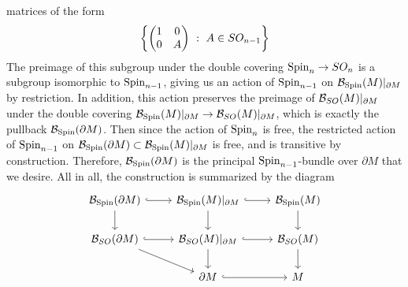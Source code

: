 matrices of the form
\[
\left\lbrace \begin{pmatrix}
1 & 0 \\
0 & A
\end{pmatrix} ~ : ~ A \in SO_{n-1} \right\rbrace
\]
The preimage of this subgroup under the double covering $\mathrm{Spin}_n \to SO_n$ is
a subgroup isomorphic to $\mathrm{Spin}_{n-1}$, giving us an action of $\mathrm{Spin}_{n-1}$ on
$\mathcal{B}_{\mathrm{Spin}}(M)\vert_{\partial M}$ by restriction. In addition, this action
preserves the preimage of $\mathcal{B}_{SO}(M)\vert_{\partial M}$ under the double
covering $\mathcal{B}_{\mathrm{Spin}}(M)\vert_{\partial M} \to \mathcal{B}_{SO}(M)\vert_{\partial M}$,
which is exactly the pullback $\mathcal{B}_{\mathrm{Spin}}(\partial M)$. Then since the
action of $\mathrm{Spin}_n$ is free, the restricted action of $\mathrm{Spin}_{n-1}$ on
$\mathcal{B}_{\mathrm{Spin}}(\partial M) \subset \mathcal{B}_{\mathrm{Spin}}(M)\vert_{\partial M}$ is
free, and is transitive by construction. Therefore, $\mathcal{B}_{\mathrm{Spin}}(\partial M)$
is the principal $\mathrm{Spin}_{n-1}$-bundle over $\partial M$ that we desire. All in
all, the construction is summarized by the diagram
\[\begin{tikzcd}
\B_{\Spin}(\partial M) \ar[d] \ar[r, hookrightarrow] & \B_{\Spin}(M)\vert_{\partial M}
\ar[r, hookrightarrow]\ar[d] & \B_{\Spin}(M) \ar[d] \\
\B_{SO}(\partial M) \ar[r, hookrightarrow] \ar[dr] &\B_{SO}(M)\vert_{\partial M}
\ar[d] \ar[r, hookrightarrow] & \B_{SO}(M) \ar[d] \\
&\partial M \ar[r, hookrightarrow] & M
\end{tikzcd}\]
%
